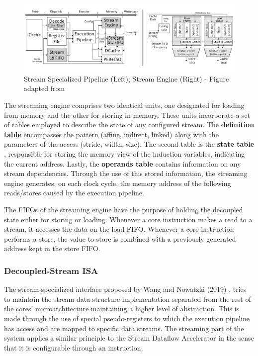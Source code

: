 \begin{figure}[H]
\begin{center}
\includegraphics[width=0.87\linewidth]{images/SD_architeture.pdf}
\caption{Stream Specialized Pipeline (Left); Stream Engine (Right) - Figure adapted from \cite{8980305}}
\label{fig:SD_architeture}
\end{center}
\end{figure}


The streaming engine comprises two identical units, one designated for loading from memory and the other for storing in memory. These units incorporate a set of tables employed to describe the state of any configured stream. The \textbf{definition table }encompasses the pattern (affine, indirect, linked) along with the parameters of the access (stride, width, size). The second table is the \textbf{state table }, responsible for storing the memory view of the induction variables, indicating the current address. Lastly, the \textbf{operands table }contains information on any stream dependencies.
Through the use of this stored information, the streaming engine generates, on each clock cycle, the memory address of the following reads/stores caused by the execution pipeline.

The FIFOs of the streaming engine have the purpose of holding the decoupled state either for storing or loading. Whenever a core instruction makes a read to a stream, it accesses the data on the load FIFO. Whenever a core instruction performs a store, the value to store is combined with a previously generated address kept in the store FIFO.


\subsubsection{Decoupled-Stream ISA}

The stream-specialized interface proposed by Wang and Nowatzki (2019) \cite{8980305}, tries to maintain the stream data structure implementation separated from the rest of the cores' microarchitecture maintaining a higher level of abstraction. This is made through the use of special pseudo-registers to which the execution pipeline has access and are mapped to specific data streams. The streaming part of the system applies a similar principle to the Stream Dataflow Accelerator in the sense that it is configurable through an instruction.

